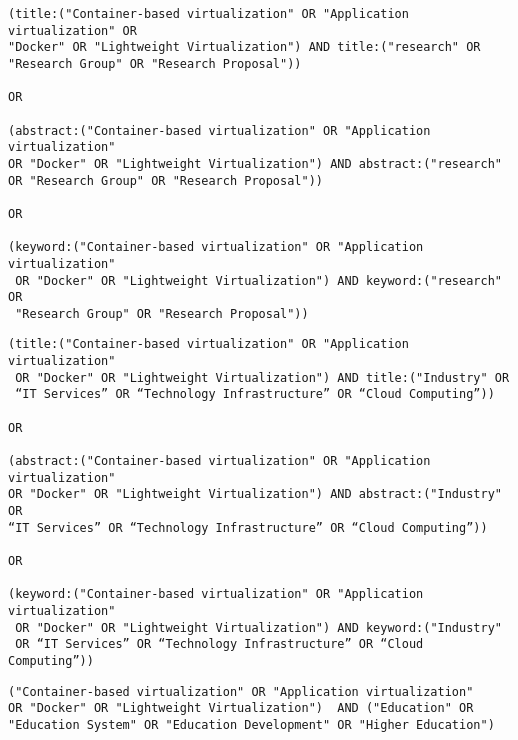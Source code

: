 \begin{tcolorbox}[
  colback=gray!5, 
  colframe=black!60, 
  title=Cadena de búsqueda en Springer para investigación, 
  fonttitle=\bfseries, 
  sharp corners=south
]
\scriptsize %
\begin{verbatim}
(title:("Container-based virtualization" OR "Application virtualization" OR 
"Docker" OR "Lightweight Virtualization") AND title:("research" OR 
"Research Group" OR "Research Proposal"))

OR

(abstract:("Container-based virtualization" OR "Application virtualization" 
OR "Docker" OR "Lightweight Virtualization") AND abstract:("research" 
OR "Research Group" OR "Research Proposal"))

OR 

(keyword:("Container-based virtualization" OR "Application virtualization"
 OR "Docker" OR "Lightweight Virtualization") AND keyword:("research" OR 
 "Research Group" OR "Research Proposal"))

\end{verbatim}
\end{tcolorbox}

\begin{tcolorbox}[
  colback=gray!5, 
  colframe=black!60, 
  title=Cadena de búsqueda en Springer para industria, 
  fonttitle=\bfseries, 
  sharp corners=south
]
\scriptsize %
\begin{verbatim}
(title:("Container-based virtualization" OR "Application virtualization"
 OR "Docker" OR "Lightweight Virtualization") AND title:("Industry" OR 
 “IT Services” OR “Technology Infrastructure” OR “Cloud Computing”))

OR

(abstract:("Container-based virtualization" OR "Application virtualization" 
OR "Docker" OR "Lightweight Virtualization") AND abstract:("Industry" OR 
“IT Services” OR “Technology Infrastructure” OR “Cloud Computing”))

OR 

(keyword:("Container-based virtualization" OR "Application virtualization"
 OR "Docker" OR "Lightweight Virtualization") AND keyword:("Industry" 
 OR “IT Services” OR “Technology Infrastructure” OR “Cloud Computing”))

\end{verbatim}
\end{tcolorbox}

\begin{tcolorbox}[
  colback=gray!5, 
  colframe=black!60, 
  title=Cadena de búsqueda en Science Direct para educación, 
  fonttitle=\bfseries, 
  sharp corners=south
]
\scriptsize %
\begin{verbatim}
("Container-based virtualization" OR "Application virtualization" 
OR "Docker" OR "Lightweight Virtualization")  AND ("Education" OR 
"Education System" OR "Education Development" OR "Higher Education")
\end{verbatim}
\end{tcolorbox}


